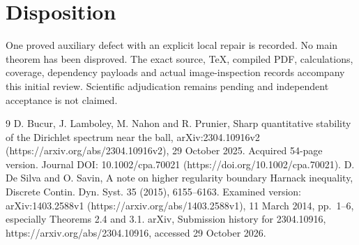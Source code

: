 \documentclass[10pt]{article}
\begin{document}
\section*{Disposition}
One proved auxiliary defect with an explicit local repair is recorded. No main theorem has been disproved. The exact source, TeX, compiled PDF, calculations, coverage, dependency payloads and actual image-inspection records accompany this initial review. Scientific adjudication remains pending and independent acceptance is not claimed.\par
9 D. Bucur, J. Lamboley, M. Nahon and R. Prunier, Sharp quantitative stability of the Dirichlet spectrum near the ball, arXiv:2304.10916v2 (https://arxiv.org/abs/2304.10916v2), 29 October 2025. Acquired 54-page version. Journal DOI: 10.1002/cpa.70021 (https://doi.org/10.1002/cpa.70021). D. De Silva and O. Savin, A note on higher regularity boundary Harnack inequality, Discrete Contin. Dyn. Syst. 35 (2015), 6155–6163. Examined version: arXiv:1403.2588v1 (https://arxiv.org/abs/1403.2588v1), 11 March 2014, pp. 1–6, especially Theorems 2.4 and 3.1. arXiv, Submission history for 2304.10916, https://arxiv.org/abs/2304.10916, accessed 29 October 2026.\par
\end{document}
